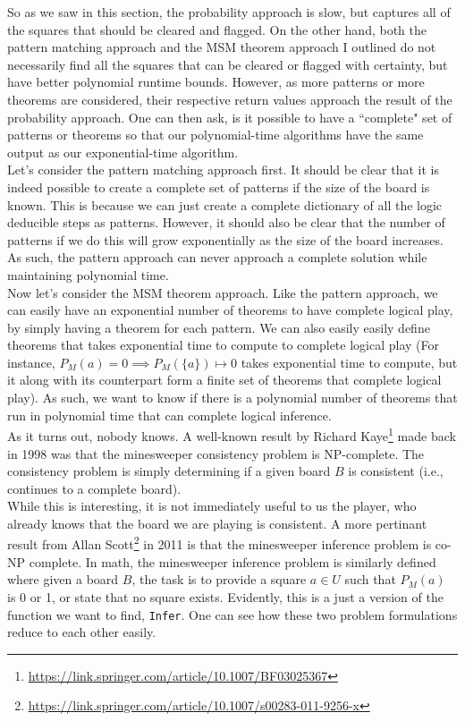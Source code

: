 So as we saw in this section, the probability approach is slow, but captures all of the squares that should be cleared and flagged. On the other hand, both the pattern matching approach and the MSM theorem approach I outlined do not necessarily find all the squares that can be cleared or flagged with certainty, but have better polynomial runtime bounds. However, as more patterns or more theorems are considered, their respective return values approach the result of the probability approach. One can then ask, is it possible to have a ``complete" set of patterns or theorems so that our polynomial-time algorithms have the same output as our exponential-time algorithm.\\

Let's consider the pattern matching approach first. It should be clear that it is indeed possible to create a complete set of patterns if the size of the board is known. This is because we can just create a complete dictionary of all the logic deducible steps as patterns. However, it should also be clear that the number of patterns if we do this will grow exponentially as the size of the board increases. As such, the pattern approach can never approach a complete solution while maintaining polynomial time.\\

Now let's consider the MSM theorem approach. Like the pattern approach, we can easily have an exponential number of theorems to have complete logical play, by simply having a theorem for each pattern. We can also easily easily define  theorems that takes exponential time to compute to complete logical play (For instance, $P_M(a)=0\implies P_M(\{a\})\mapsto 0$ takes exponential time to compute, but it along with its counterpart form a finite set of theorems that complete logical play). As such, we want to know if there is a polynomial number of theorems that run in polynomial time that can complete logical inference.\\

As it turns out, nobody knows. A well-known result by Richard Kaye\footnote{\url{https://link.springer.com/article/10.1007/BF03025367}} made back in 1998 was that the minesweeper consistency problem is NP-complete. The consistency problem is simply determining if a given board $B$ is consistent (i.e., continues to a complete board).\\

While this is interesting, it is not immediately useful to us the player, who already knows that the board we are playing is consistent. A more pertinant result from Allan Scott\footnote{\url{https://link.springer.com/article/10.1007/s00283-011-9256-x}} in 2011 is that the minesweeper inference problem is co-NP complete. In math, the minesweeper inference problem is similarly defined where given a board $B$, the task is to provide a square $a\in U$ such that $P_M(a)$ is 0 or 1, or state that no square exists. Evidently, this is a just a version of the function we want to find, \texttt{Infer}. One can see how these two problem formulations reduce to each other easily.\\

